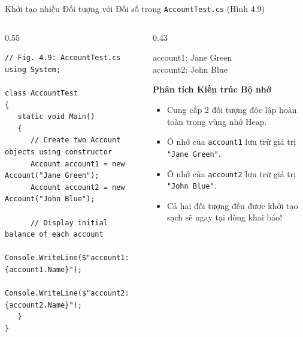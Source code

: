 \documentclass[aspectratio=169, 10pt]{beamer}
\begin{document}
\begin{frame}[fragile]{Khởi tạo nhiều Đối tượng với Đối số trong \texttt{AccountTest.cs} (Hình 4.9)}
  \begin{columns}[T]
    \begin{column}{0.55\textwidth}
      \begin{tcolorbox}[colback=CodeBg,colframe=UniNavy,title=\textbf{AccountTest.cs using Constructor (Fig. 4.9)},fonttitle=\small\bfseries]
\begin{lstlisting}
// Fig. 4.9: AccountTest.cs
using System;

class AccountTest
{
   static void Main()
   {
      // Create two Account objects using constructor
      Account account1 = new Account("Jane Green");
      Account account2 = new Account("John Blue");

      // Display initial balance of each account
      Console.WriteLine($"account1: {account1.Name}");
      Console.WriteLine($"account2: {account2.Name}");
   }
}
\end{lstlisting}
      \end{tcolorbox}
    \end{column}

    \begin{column}{0.43\textwidth}
      \begin{tcolorbox}[colback=UniDark,colframe=UniNavy,title=\textbf{Màn hình Console Output},fonttitle=\small\bfseries]
        \color{white}\ttfamily\scriptsize
        account1: Jane Green\\
        account2: John Blue
      \end{tcolorbox}
      \begin{exampleblock}{\textbf{Phân tích Kiến trúc Bộ nhớ}}
        \begin{itemize}\small
          \item Cung cấp 2 đối tượng độc lập hoàn toàn trong vùng nhớ Heap.
          \item Ô nhớ của \texttt{account1} lưu trữ giá trị \texttt{"Jane Green"}.
          \item Ô nhớ của \texttt{account2} lưu trữ giá trị \texttt{"John Blue"}.
          \item Cả hai đối tượng đều được khởi tạo sạch sẽ ngay tại dòng khai báo!
        \end{itemize}
      \end{exampleblock}
    \end{column}
  \end{columns}
\end{frame}
\end{document}
